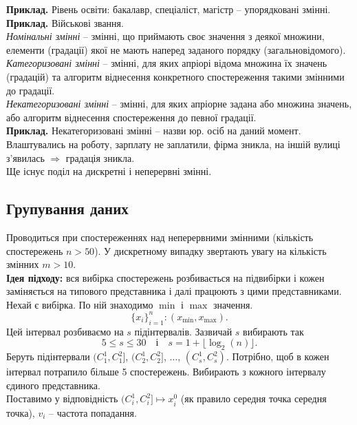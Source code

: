 \textbf{Приклад.} Рівень освіти: бакалавр, спеціаліст, магістр -- упорядковані змінні.\\

\textbf{Приклад.} Військові звання.\\

\textit{Номінальні змінні} -- змінні, що приймають своє значення з деякої множини, елементи (градації) якої не мають наперед заданого порядку (загальновідомого). \\

\textit{Категоризовані змінні} -- змінні, для яких апріорі відома множина їх значень (градацій) та алгоритм віднесення конкретного спостереження такими змінними до градації. \\

\textit{Некатегоризовані змінні} -- змінні, для яких апріорне задана або множина значень, або алгоритм віднесення спостереження до певної градації. \\

\textbf{Приклад.} Некатегоризовані змінні -- назви юр. осіб на даний момент. Влаштувались на роботу, зарплату не заплатили, фірма зникла, на іншій вулиці з'явилась $\Rightarrow$ градація зникла. \\

Ще існує поділ на дискретні і неперервні змінні.
\subsection{Групування даних}
Проводиться при спостереженнях над неперервними змінними (кількість спостережень $n > 50$). У дискретному випадку звертають увагу на кількість змінних $m > 10$. \\

\textbf{Ідея підходу:} вся вибірка спостережень розбивається на підвибірки і кожен заміняється на типового представника і далі працюють з цими представниками. \\

Нехай є вибірка. По ній знаходимо $\min$ і $\max$ значення.  \[ \{x_i\}_{i=1}^n: (x_{\min}, x_{\max}).\]
Цей інтервал розбиваємо на $s$ підінтервалів. Зазвичай $s$ вибирають так \[ 5 \le s \le 30 \quad \text{і} \quad s = 1 + \lfloor \log_2(n) \rfloor. \]
Беруть підінтервали $(C_1^1, C_1^2]$, $(C_2^1, C_2^2]$, $\ldots$, $(C_s^1, C_s^2)$. Потрібно, щоб в кожен інтервал потрапило більше 5 спостережень. Вибирають з кожного інтервалу єдиного представника. \\

Поставимо у відповідність $(C_i^1, C_i^2] \mapsto x_i^0$ (як правило середня точка середня точка), $v_i$ -- частота попадання. \\


